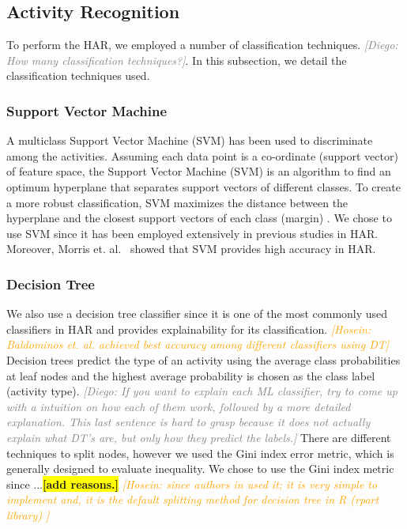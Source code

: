 \documentclass[journal,article,submit,moreauthors,pdftex]{Definitions/mdpi}
\newcommand{\hosein}[1]{\textcolor{orange}{{\it [Hosein: #1]}}}
\newcommand{\diego}[1]{\textcolor{gray}{{\it [Diego: #1]}}}
\newcommand{\todo}[1]{\colorbox{yellow}{\textbf{[#1]}}}
\begin{document}
\subsection{Activity Recognition}
To perform the HAR, we employed a number of classification techniques. \diego{How many classification techniques?}. In this subsection, we detail the classification techniques used.

\subsubsection{Support Vector Machine}
A multiclass Support Vector Machine (SVM) has been used to discriminate among the activities. Assuming each data point is a co-ordinate (support vector) of feature space, the Support Vector Machine (SVM) is an algorithm to find an optimum hyperplane that separates support vectors of different classes. To create a more robust classification, SVM maximizes the distance between the hyperplane and the closest support vectors of each class (margin) \cite{zhang2012physical}. We chose to use SVM since it has been employed extensively in previous studies in HAR. Moreover, Morris et. al.~\cite{morris2014recofit,rosati2018comparison} showed that SVM provides high accuracy in HAR.



\subsubsection{Decision Tree}

We also use a decision tree classifier since it is one of the most commonly used classifiers in HAR \cite{mortazavi2014determining, baldominos2019comparison} and provides explainability for its classification. \hosein{Baldominos et. al. \cite{baldominos2019comparison} achieved best accuracy among different classifiers using DT} Decision trees predict the type of an activity using the average class probabilities at leaf nodes and the highest average probability is chosen as the class label (activity type).
\diego{If you want to explain each ML classifier, try to come up with a intuition on how each of them work, followed by a more detailed explanation. This last sentence is hard to grasp because it does not actually explain what DT's are, but only how they predict the labels.}
There are different techniques to split nodes, however we used the Gini index error metric, which is generally designed to evaluate inequality. We chose to use the Gini index metric since ...\todo{add reasons.} \hosein{since authors in \cite{rosati2018comparison, masum2018human}used it; it is very simple to implement and, it is the default splitting method for decision tree in R (rpart library) }
\end{document}
